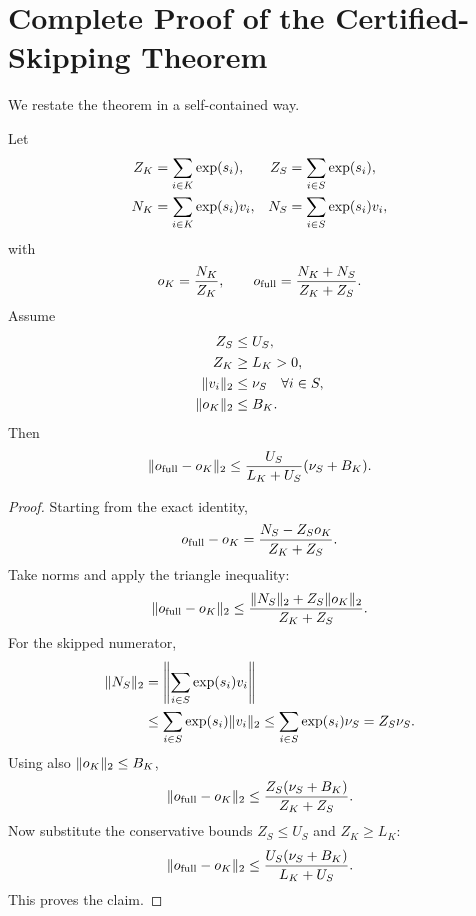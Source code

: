 \section{Complete Proof of the Certified-Skipping Theorem}
\label{app:proof}

We restate the theorem in a self-contained way.

\begin{theorem}[Restated]
Let
\begin{align}
  Z_K &= \sum_{i \in K} \operatorname{exp}(s_i), &
  Z_S &= \sum_{i \in S} \operatorname{exp}(s_i),\\
  N_K &= \sum_{i \in K} \operatorname{exp}(s_i) v_i, &
  N_S &= \sum_{i \in S} \operatorname{exp}(s_i) v_i,
\end{align}
with
\begin{equation}
  o_K = \frac{N_K}{Z_K},
  \qquad
  o_{\mathrm{full}} = \frac{N_K + N_S}{Z_K + Z_S}.
\end{equation}
Assume
\begin{align}
  Z_S &\le U_S, \\
  Z_K &\ge L_K > 0, \\
  \lVert v_i \rVert_2 &\le \nu_S \quad \forall i \in S, \\
  \lVert o_K \rVert_2 &\le B_K.
\end{align}
Then
\begin{equation}
  \lVert o_{\mathrm{full}} - o_K \rVert_2
  \le
  \frac{U_S}{L_K + U_S}(\nu_S + B_K).
\end{equation}
\end{theorem}

\begin{proof}
Starting from the exact identity,
\begin{equation}
  o_{\mathrm{full}} - o_K = \frac{N_S - Z_S o_K}{Z_K + Z_S}.
\end{equation}
Take norms and apply the triangle inequality:
\begin{equation}
  \lVert o_{\mathrm{full}} - o_K \rVert_2
  \le
  \frac{\lVert N_S \rVert_2 + Z_S \lVert o_K \rVert_2}{Z_K + Z_S}.
\end{equation}
For the skipped numerator,
\begin{align}
  \lVert N_S \rVert_2
  &=
  \left\lVert \sum_{i \in S} \operatorname{exp}(s_i) v_i \right\rVert \\
  &\le
  \sum_{i \in S} \operatorname{exp}(s_i)\lVert v_i \rVert_2
  \le
  \sum_{i \in S} \operatorname{exp}(s_i)\nu_S
  = Z_S \nu_S.
\end{align}
Using also $\lVert o_K \rVert_2 \le B_K$,
\begin{equation}
  \lVert o_{\mathrm{full}} - o_K \rVert_2
  \le
  \frac{Z_S(\nu_S + B_K)}{Z_K + Z_S}.
\end{equation}
Now substitute the conservative bounds $Z_S \le U_S$ and $Z_K \ge L_K$:
\begin{equation}
  \lVert o_{\mathrm{full}} - o_K \rVert_2
  \le
  \frac{U_S(\nu_S + B_K)}{L_K + U_S}.
\end{equation}
This proves the claim.
\end{proof}

